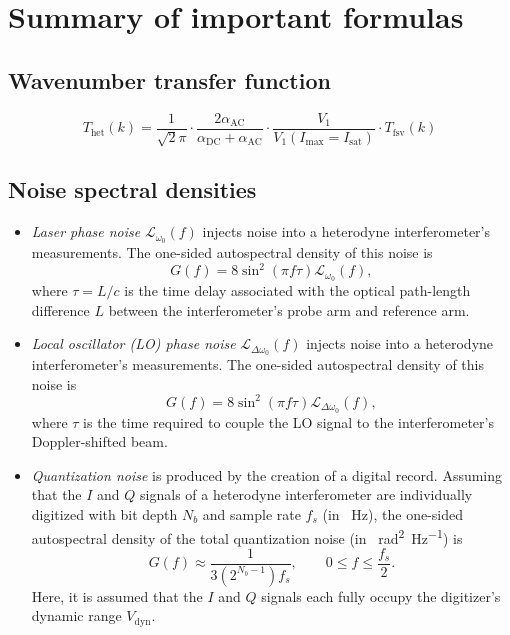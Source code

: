 \section{Summary of important formulas}


\subsection{Wavenumber transfer function}
\begin{equation}
  T_{\text{het}}(k)
  =
  \frac{1}{\sqrt{2} \pi}
  \cdot
  \frac{2 \alpha_{\text{AC}}}{\alpha_{\text{DC}} + \alpha_{\text{AC}}}
  \cdot
  \frac{V_1}{V_1(I_{\text{max}} = I_{\text{sat}})}
  \cdot
  T_{\text{fsv}}(k)
\end{equation}


\subsection{Noise spectral densities}

\begin{itemize}
  \item \emph{Laser phase noise}
    $\mathcal{L}_{\omega_0}(f)$
    injects noise into a heterodyne interferometer's measurements.
    The one-sided autospectral density of this noise is
    \begin{equation}
      G(f)
      =
      8 \sin^2(\pi f \tau) \mathcal{L}_{\omega_0}(f),
    \end{equation}
    where $\tau = L / c$ is the time delay
    associated with the optical path-length difference $L$
    between the interferometer's probe arm and reference arm.
  \item \emph{Local oscillator (LO) phase noise}
    $\mathcal{L}_{\Delta \omega_0}(f)$
    injects noise into a heterodyne interferometer's measurements.
    The one-sided autospectral density of this noise is
    \begin{equation}
      G(f)
      =
      8 \sin^2(\pi f \tau) \mathcal{L}_{\Delta \omega_0}(f),
    \end{equation}
    where $\tau$ is the time required to couple the LO signal
    to the interferometer's Doppler-shifted beam.
  \item \emph{Quantization noise} is produced
    by the creation of a digital record.
    Assuming that the $I$ and $Q$ signals of a heterodyne interferometer
    are individually digitized with bit depth $N_b$ and
    sample rate $f_s$ (in \SI{}{\hertz}),
    the one-sided autospectral density of the total quantization noise
    (in \SI{}{\radian\squared\per\hertz}) is
    \begin{equation}
      G(f)
      \approx
      \frac{1}{3 (2^{N_b - 1}) f_s},
      \qquad
      0 \leq f \leq \frac{f_s}{2}.
    \end{equation}
    Here, it is assumed that the $I$ and $Q$ signals each fully occupy
    the digitizer's dynamic range $V_{\text{dyn}}$.
\end{itemize}




